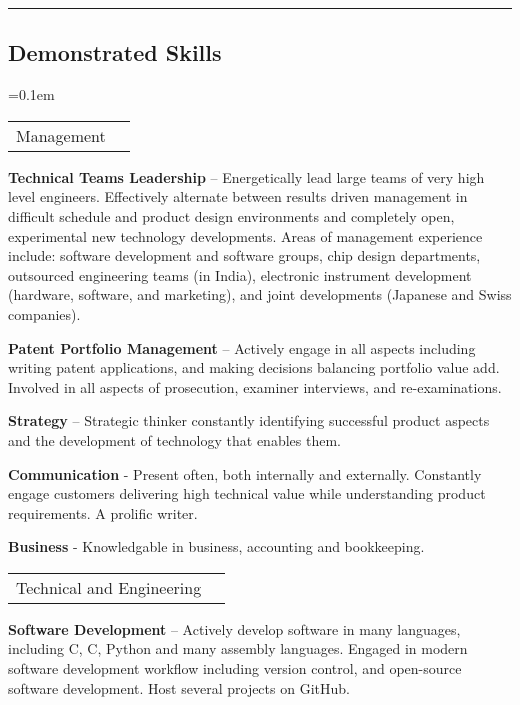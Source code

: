 \documentclass[10pt,letterpaper]{extarticle}
\makeatletter
\newenvironment{indentsection}[1]%
{\begin{list}{}%
	{\setlength{\leftmargin}{#1}}%
	\item[]%
}
{\end{list}}
\newcommand{\headerrow}[2]
{\begin{tabular*}{\linewidth}{l@{\extracolsep{\fill}}r}
	#1 &
	#2 \\
\end{tabular*}}
\newcommand{\CPP}
{C\nolinebreak[4]\hspace{-.05em}\raisebox{.22ex}{\footnotesize\bf ++}}
\makeatother
\begin{document}
\hrule
\vspace{-1em}\subsection*{\Large Demonstrated Skills}\vspace{-0.5em}
	\parskip=0.1em
\begin{flushleft} 

\vspace{0.2em}
\headerrow
{\large Management}{}\vspace{-0.7em}
\begin{indentsection}{-1em}\begin{itemize*}
		\item \textbf{Technical Teams Leadership} -- Energetically lead large teams of very high level engineers.  Effectively alternate between results driven management in difficult schedule and product design environments and completely open, experimental new technology developments.  Areas of management experience include: software development and software groups, chip design departments, outsourced engineering teams (in India), electronic instrument development (hardware, software, and marketing), and joint developments (Japanese and Swiss companies).
		\item \textbf{Patent Portfolio Management} -- Actively engage in all aspects including writing patent applications, and making decisions balancing portfolio value add.  Involved in all aspects of prosecution, examiner interviews, and re-examinations.
                  \item \textbf{Strategy} -- Strategic thinker constantly identifying successful product aspects and the development of technology that enables them.
                 \item \textbf{Communication} - Present often, both internally and externally.  Constantly engage customers delivering high technical value while understanding product requirements.  A prolific writer.
               \item \textbf{Business} - Knowledgable in business, accounting and bookkeeping.
\end{itemize*}\end{indentsection}
\headerrow
{\large Technical and Engineering}{}\vspace{-0.7em}
\begin{indentsection}{-1em}\begin{itemize*}
		\item \textbf{Software Development} -- Actively develop software in many languages, including C, \CPP, Python and many assembly languages.  Engaged in modern software development workflow including version control, and open-source software development.  Host several projects on GitHub.

\end{itemize*}
\end{indentsection}
\end{flushleft}
\end{document}
